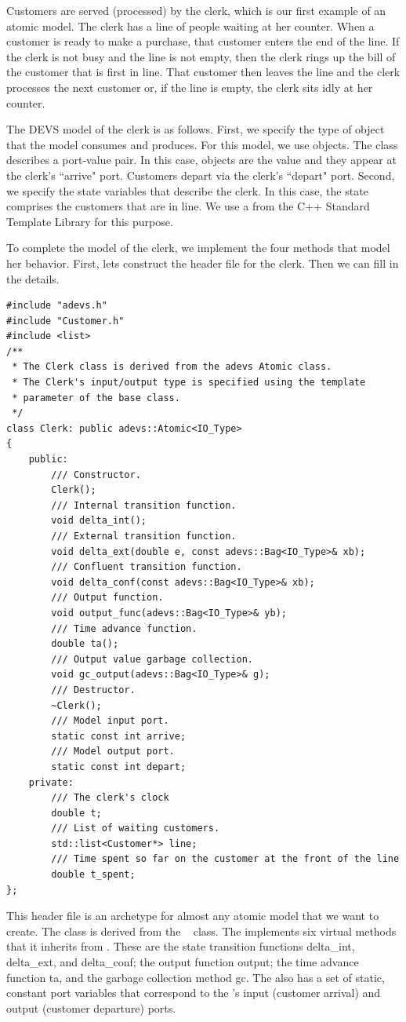 Customers are served (processed) by the clerk, which is our first example of an atomic model. The clerk has a line of people waiting at her counter. When a customer is ready to make a purchase, that customer enters the end of the line. If the clerk is not busy and the line is not empty, then the clerk rings up the bill of the customer that is first in line. That customer then leaves the line and the clerk processes the next customer or, if the line is empty, the clerk sits idly at her counter.

The DEVS model of the clerk is as follows. First, we specify the type of object that the model consumes and produces. For this model, we use  objects. The  class describes a port-value pair. In this case,  objects are the value and they appear at the clerk's ``arrive" port. Customers depart via the clerk's ``depart" port. Second, we specify the state variables that describe the clerk. In this case, the state comprises the customers that are in line. We use a  from the C++ Standard Template Library for this purpose.

To complete the model of the clerk, we implement the four methods that model her behavior. First, lets construct the header file for the clerk. Then we can fill in the details.
\begin{verbatim}
#include "adevs.h"
#include "Customer.h"
#include <list>
/**
 * The Clerk class is derived from the adevs Atomic class.
 * The Clerk's input/output type is specified using the template
 * parameter of the base class.
 */
class Clerk: public adevs::Atomic<IO_Type> 
{
    public:
        /// Constructor.
        Clerk();
        /// Internal transition function.
        void delta_int();
        /// External transition function.
        void delta_ext(double e, const adevs::Bag<IO_Type>& xb);
        /// Confluent transition function.
        void delta_conf(const adevs::Bag<IO_Type>& xb);
        /// Output function.  
        void output_func(adevs::Bag<IO_Type>& yb);
        /// Time advance function.
        double ta();
        /// Output value garbage collection.
        void gc_output(adevs::Bag<IO_Type>& g);
        /// Destructor.
        ~Clerk();
        /// Model input port.
        static const int arrive;
        /// Model output port.
        static const int depart;
    private:
        /// The clerk's clock
        double t;
        /// List of waiting customers.
        std::list<Customer*> line;
        /// Time spent so far on the customer at the front of the line
        double t_spent;
};
\end{verbatim}
This header file is an archetype for almost any atomic model that we want to create. The  class is derived from the \adevs\  class. The  implements six virtual methods that it inherits from . These are the state transition functions delta\_int, delta\_ext, and delta\_conf; the output function output; the time advance function ta, and the garbage collection method gc. The  also has a set of static, constant port variables that correspond to the 's input (customer arrival) and output (customer departure) ports.

